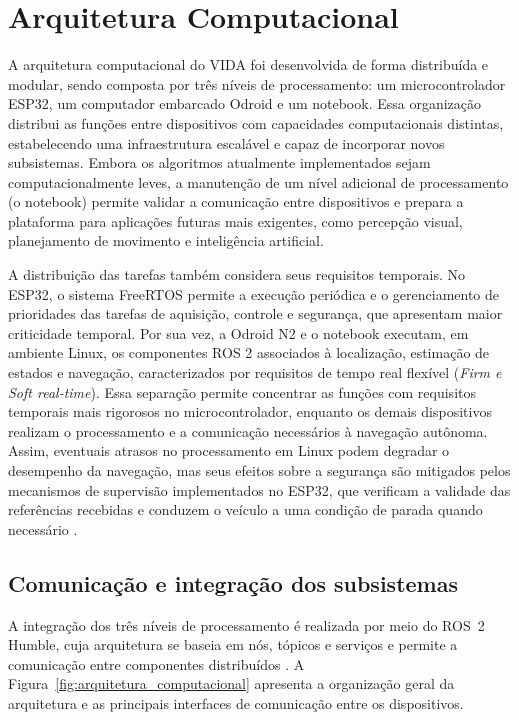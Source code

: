 \section{Arquitetura Computacional}
\label{sec:arquitetura}

A arquitetura computacional do VIDA foi desenvolvida de forma distribuída e modular, sendo composta por três níveis de processamento: um microcontrolador ESP32, um computador embarcado Odroid e um notebook. Essa organização distribui as funções entre dispositivos com capacidades computacionais distintas, estabelecendo uma infraestrutura escalável e capaz de incorporar novos subsistemas. Embora os algoritmos atualmente implementados sejam computacionalmente leves, a manutenção de um nível adicional de processamento (o notebook) permite validar a comunicação entre dispositivos e prepara a plataforma para aplicações futuras mais exigentes, como percepção visual, planejamento de movimento e inteligência artificial.

A distribuição das tarefas também considera seus requisitos temporais. No ESP32, o sistema FreeRTOS permite a execução periódica e o gerenciamento de prioridades das tarefas de aquisição, controle e segurança, que apresentam maior criticidade temporal. Por sua vez, a Odroid N2 e o notebook executam, em ambiente Linux, os componentes ROS 2 associados à localização, estimação de estados e navegação, caracterizados por requisitos de tempo real flexível (\textit{Firm e Soft real-time}). Essa separação permite concentrar as funções com requisitos temporais mais rigorosos no microcontrolador, enquanto os demais dispositivos realizam o processamento e a comunicação necessários à navegação autônoma. Assim, eventuais atrasos no processamento em Linux podem degradar o desempenho da navegação, mas seus efeitos sobre a segurança são mitigados pelos mecanismos de supervisão implementados no ESP32, que verificam a validade das referências recebidas e conduzem o veículo a uma condição de parada quando necessário \citep{Buttazzo2011,Bonci2026}.


\subsection{Comunicação e integração dos subsistemas}

A integração dos três níveis de processamento é realizada por meio do ROS~2 Humble, cuja arquitetura se baseia em nós, tópicos e serviços e permite a comunicação entre componentes distribuídos \citep{Macenski2022,Hong2024,Bonci2026}. A Figura~\ref{fig:arquitetura_computacional} apresenta a organização geral da arquitetura e as principais interfaces de comunicação entre os dispositivos.

